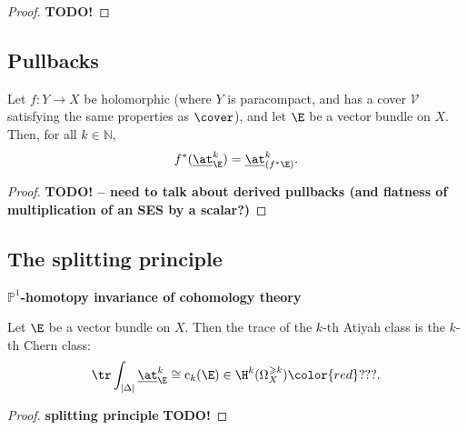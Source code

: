         \begin{proof}
            {\color{red}\textbf{TODO!}}
        \end{proof}
    

    \subsection{Pullbacks} %
    \label{sub:pullbacks}

        \begin{lemma}
            Let $f\colon Y\to X$ be holomorphic (where $Y$ is paracompact, and has a cover $\mathcal{V}$ satisfying the same properties as $\cover$), and let $\E$ be a vector bundle on $X$.
            Then, for all $k\in\mathbb{N}$,
            \begin{equation*}
                f^*(\underline{\at}^k_\E) = \underline{\at}^k_{(f^*\E)}.\qedhere
            \end{equation*}
        \end{lemma}

        \begin{proof}
            {\color{red}\textbf{TODO! -- need to talk about derived pullbacks (and flatness of multiplication of an SES by a scalar?)}}
        \end{proof}
    

    \subsection{The splitting principle} %
    \label{sub:the_splitting_principle}

        {\color{red}\textbf{$\mathbb{P}^1$-homotopy invariance of cohomology theory}}

        \begin{theorem}
            Let $\E$ be a vector bundle on $X$.
            Then the trace of the $k$-th Atiyah class is the $k$-th Chern class:
            \begin{equation*}
                \tr\int_{|\Delta|}\underline{\at}_\E^k \cong \operatorname{c}_k(\E) \in \H^{k}(\Omega_X^{\geqslant k}) {\color{red}???}.\qedhere
            \end{equation*}
        \end{theorem}

        \begin{proof}
            {\color{red}\textbf{splitting principle}}
            {\color{red}\textbf{TODO!}}
        \end{proof}
    
